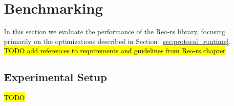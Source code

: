 \chapter{Benchmarking}
\label{sec:benchmarking}

In this section we evaluate the performance of the Reo-rs library, focusing primarily on the optimizations described in Section~\ref{sec:protocol_runtime}.
\hl{TODO add references to requirements and guidelines from Reo-rs chapter}

\section{Experimental Setup}
\hl{TODO}



%
%
%
%
%
%
%
